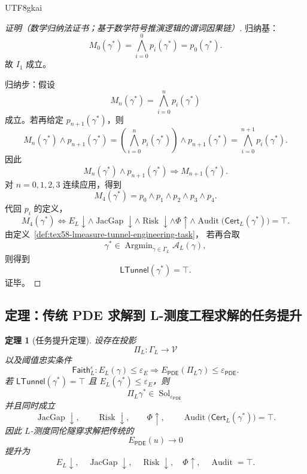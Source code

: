 \documentclass[12pt]{article}
\newtheorem{theorem}{定理}[section]
\newcommand{\Vcal}{\mathcal V}
\newcommand{\PDE}{\ensuremath{\mathsf{PDE}}}
\DeclareMathOperator{\Sol}{Sol}
\DeclareMathOperator{\Audit}{Audit}
\DeclareMathOperator{\JacGap}{JacGap}
\DeclareMathOperator{\Risk}{Risk}
\DeclareMathOperator*{\Argmin}{Argmin}
\begin{document}
\begin{CJK*}{UTF8}{gkai}
\begin{proof}[证明（数学归纳法证书；基于数学符号推演逻辑的谓词因果链）]
归纳基：
\[
  M_0(\gamma^\ast)
  =
  \bigwedge_{i=0}^{0}p_i(\gamma^\ast)
  =
  p_0(\gamma^\ast).
\]
故 \(I_1\) 成立。

归纳步：假设
\[
  M_n(\gamma^\ast)=\bigwedge_{i=0}^{n}p_i(\gamma^\ast)
\]
成立。若再给定 \(p_{n+1}(\gamma^\ast)\)，则
\[
  M_n(\gamma^\ast)\wedge p_{n+1}(\gamma^\ast)
  =
  \left(\bigwedge_{i=0}^{n}p_i(\gamma^\ast)\right)
  \wedge p_{n+1}(\gamma^\ast)
  =
  \bigwedge_{i=0}^{n+1}p_i(\gamma^\ast).
\]
因此
\[
  M_n(\gamma^\ast)\wedge p_{n+1}(\gamma^\ast)
  \Rightarrow
  M_{n+1}(\gamma^\ast).
\]
对 \(n=0,1,2,3\) 连续应用，得到
\[
  M_4(\gamma^\ast)
  =
  p_0\wedge p_1\wedge p_2\wedge p_3\wedge p_4.
\]
代回 \(p_i\) 的定义，
\[
  M_4(\gamma^\ast)
  \Longleftrightarrow
  E_L\downarrow
  \wedge
  \JacGap\downarrow
  \wedge
  \Risk\downarrow
  \wedge
  \Phi\uparrow
  \wedge
  \Audit\bigl(\mathsf{Cert}_L(\gamma^\ast)\bigr)=\top.
\]
由定义~\ref{def:tex58-lmeasure-tunnel-engineering-task}，
若再合取
\[
  \gamma^\ast\in\Argmin_{\gamma\in\Gamma_L}\mathcal A_L(\gamma),
\]
则得到
\[
  \mathsf{LTunnel}(\gamma^\ast)=\top.
\]
证毕。
\end{proof}

\subsection[定理：PDE 到 L-测度工程求解提升]{定理：传统 PDE 求解到 L-测度工程求解的任务提升}
\label{subsec:tex58-task-lift-theorem}

\begin{theorem}[任务提升定理]
\label{thm:tex58-task-lift}
设存在投影
\[
  \Pi_L:\Gamma_L\to\Vcal
\]
以及阈值忠实条件
\[
  \mathsf{Faith}_L^{\varepsilon}
  :
  E_L(\gamma)\le\varepsilon_E
  \Rightarrow
  E_{\PDE}(\Pi_L\gamma)\le\varepsilon_{\PDE}.
\]
若 \(\mathsf{LTunnel}(\gamma^\ast)=\top\) 且 \(E_L(\gamma^\ast)\le\varepsilon_E\)，则
\[
  \Pi_L\gamma^\ast\in\Sol_{\varepsilon_{\PDE}}
\]
并且同时成立
\[
  \JacGap\downarrow,
  \qquad
  \Risk\downarrow,
  \qquad
  \Phi\uparrow,
  \qquad
  \Audit\bigl(\mathsf{Cert}_L(\gamma^\ast)\bigr)=\top.
\]
因此 \(L\)-测度同伦隧穿求解把传统的
\[
  E_{\PDE}(u)\to0
\]
提升为
\[
  E_L\downarrow,\quad
  \JacGap\downarrow,\quad
  \Risk\downarrow,\quad
  \Phi\uparrow,\quad
  \Audit=\top.
\]
\end{theorem}


\end{CJK*}
\end{document}
